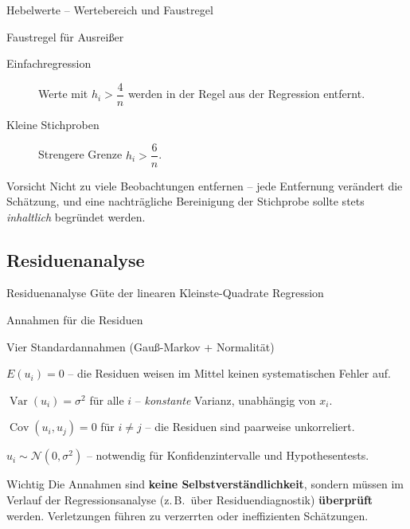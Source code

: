 \documentclass[aspectratio=169,11pt]{beamer}
\begin{document}
\begin{frame}{Hebelwerte -- Wertebereich und Faustregel}

  \begin{alertblock}{Faustregel für Ausreißer}
    \begin{description}
      \item[Einfachregression] Werte mit $h_i > \dfrac{4}{n}$ werden in
            der Regel aus der Regression entfernt.
      \item[Kleine Stichproben] Strengere Grenze $h_i > \dfrac{6}{n}$.
    \end{description}
  \end{alertblock}

  \begin{exampleblock}{Vorsicht}
    Nicht zu viele Beobachtungen entfernen -- jede Entfernung verändert
    die Schätzung, und eine nachträgliche \glqq Bereinigung\grqq{} der
    Stichprobe sollte stets \emph{inhaltlich} begründet werden.
  \end{exampleblock}
\end{frame}
\subsection{Residuenanalyse}

\begin{frame}{Residuenanalyse}
  Güte der linearen Kleinste-Quadrate Regression
\end{frame}

\begin{frame}{Annahmen für die Residuen}
  \begin{block}{Vier Standardannahmen (Gauß-Markov + Normalität)}
    \begin{description}
      \setlength{\itemsep}{0.4em}
      \item[Erwartungswert $0$]
            $E(u_i) = 0$ -- die Residuen weisen im Mittel keinen
            systematischen Fehler auf.
      \item[Homoskedastizität]
            $\operatorname{Var}(u_i) = \sigma^{2}$ für alle $i$ --
            \emph{konstante} Varianz, unabhängig von $x_i$.
      \item[Keine Autokorrelation]
            $\operatorname{Cov}(u_i, u_j) = 0$ für $i \ne j$ --
            die Residuen sind paarweise unkorreliert.
      \item[Normalverteilung]
            $u_i \sim \mathcal{N}(0, \sigma^{2})$ -- notwendig für
            Konfidenzintervalle und Hypothesentests.
    \end{description}
  \end{block}

  \begin{alertblock}{Wichtig}
    Die Annahmen sind \textbf{keine Selbstverständlichkeit}, sondern
    müssen im Verlauf der Regressionsanalyse (z.\,B.\ über
    Residuendiagnostik) \textbf{überprüft} werden. Verletzungen führen
    zu verzerrten oder ineffizienten Schätzungen.
  \end{alertblock}
\end{frame}
\end{document}
